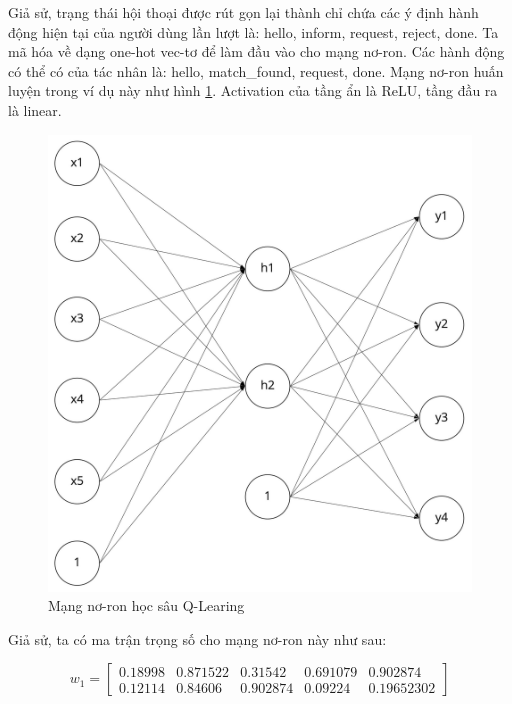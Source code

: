 Giả sử, trạng thái hội thoại được rút gọn lại thành chỉ chứa các ý định hành động hiện tại của người dùng lần lượt là: hello, inform, request, reject, done. Ta mã hóa về dạng one-hot vec-tơ để làm đầu vào cho mạng nơ-ron. Các hành động có thể có của tác nhân là: hello, match\_found, request, done. Mạng nơ-ron huấn luyện trong ví dụ này như hình \ref{fig:examnetwork}. Activation của tầng ẩn là ReLU, tầng đầu ra là linear.

\begin{center}
    \begin{figure}[h!]
        \begin{center}
         \includegraphics[scale=0.15]{chapter3/img/neural_network.jpg}
        \end{center}
        \caption{Mạng nơ-ron học sâu Q-Learing}
        \label{fig:examnetwork}
    \end{figure}
\end{center}

Giả sử, ta có ma trận trọng số cho mạng nơ-ron này như sau:

\begin{equation*}
    w_1 = 
    \begin{bmatrix}
        0.18998 & 0.871522 & 0.31542 & 0.691079 & 0.902874 \\
        0.12114 & 0.84606 & 0.902874 & 0.09224 & 0.19652302
    \end{bmatrix}
\end{equation*}

